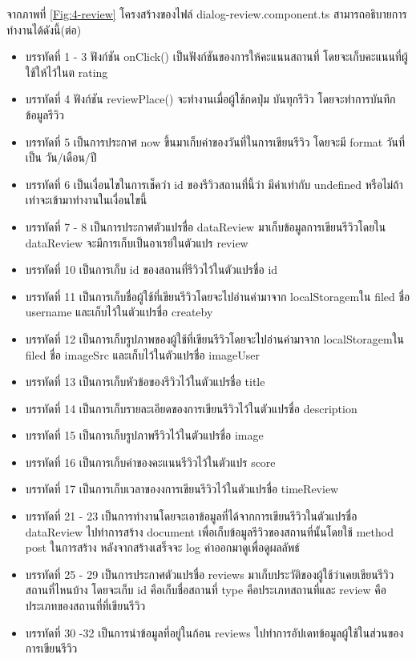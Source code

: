 จากภาพที่ \ref{Fig:4-review} โครงสร้างของไฟล์ dialog-review.component.ts สามารถอธิบายการทำงานได้ดังนี้(ต่อ)
\begin{itemize}[label={--}]
\item บรรทัดที่ 1 - 3 ฟังก์ชัน onClick() เป็นฟังก์ชันของการให้คะแนนสถานที่ โดยจะเก็บคะแนนที่ผู้ใช้ให้ไว้ในต rating
\item บรรทัดที่ 4 ฟังก์ชัน reviewPlace() จะทำงานเมื่อผู้ใช้กดปุ่ม บันทุกรีวิว โดยจะทำการบันทึกข้อมูลรีวิว
\item บรรทัดที่ 5 เป็นการประกาศ now ขึ้นมาเก็บค่าของวันที่ในการเขียนรีวิว โดยจะมี format วันที่เป็น วัน/เดือน/ปี
\item บรรทัดที่ 6 เป็นเงื่อนไขในการเช็คว่า id ของรีวิวสถานที่นี้ว่า มีค่าเท่ากับ undefined หรือไม่ถ้าเท่าจะเข้ามาทำงานในเงื่อนไขนี้
\item บรรทัดที่ 7 - 8 เป็นการประกาศตัวแปรชื่อ dataReview มาเก็บข้อมูลการเขียนรีวิวโดยใน dataReview จะมีการเก็บเป็นอาเรย์ในตัวแปร review
\item บรรทัดที่ 10 เป็นการเก็บ id ของสถานที่รีวิวไว้ในตัวแปรชื่อ id 
\item บรรทัดที่ 11 เป็นการเก็บชื่อผู้ใช้ที่เขียนรีวิวโดยจะไปอ่านค่ามาจาก localStoragemใน filed ชื่อ username และเก็บไว้ในตัวแปรชื่อ createby
\item บรรทัดที่ 12 เป็นการเก็บรูปภาพของผู้ใช้ที่เขียนรีวิวโดยจะไปอ่านค่ามาจาก localStoragemใน filed ชื่อ imageSrc และเก็บไว้ในตัวแปรชื่อ imageUser
\item บรรทัดที่ 13 เป็นการเก็บหัวข้อของรีวิวไว้ในตัวแปรชื่อ title
\item บรรทัดที่ 14 เป็นการเก็บรายละเอียดของการเขียนรีวิวไว้ในตัวแปรชื่อ description
\item บรรทัดที่ 15 เป็นการเก็บรูปภาพรีวิวไว้ในตัวแปรชื่อ image
\item บรรทัดที่ 16 เป็นการเก็บค่าของคะแนนรีวิวไว้ในตัวแปร score
\item บรรทัดที่ 17 เป็นการเก็บเวลาของงการเขียนรีวิวไว้ในตัวแปรชื่อ timeReview
\item บรรทัดที่ 21 - 23 เป็นการทำงานโดยจะเอาข้อมูลที่ได้จากการเขียนรีวิวในตัวแปรชื่อ dataReview ไปทำการสร้าง document เพื่อเก็บข้อมูลรีวิวของสถานที่นั้นโดยใช้ method post ในการสร้าง หลังจากสร้างเสร็จจะ log ค่าออกมาดูเพื่อดูผลลัพธ์
\item บรรทัดที่ 25 - 29 เป็นการประกาศตัวแปรชื่อ reviews มาเก็บประวัติของผู้ใช้ว่าเคยเขียนรีวิวสถานที่ไหนบ้าง โดยจะเก็บ id คือเก็บชื่อสถานที่ type คือประเภทสถานที่และ review คือประเภทของสถานที่ที่เขียนรีวิว
\item บรรทัดที่ 30 -32 เป็นการนำข้อมูลที่อยู่ในก้อน reviews ไปทำการอัปเดทข้อมูลผู้ใช้ในส่วนของการเขียนรีวิว
\end{itemize}

